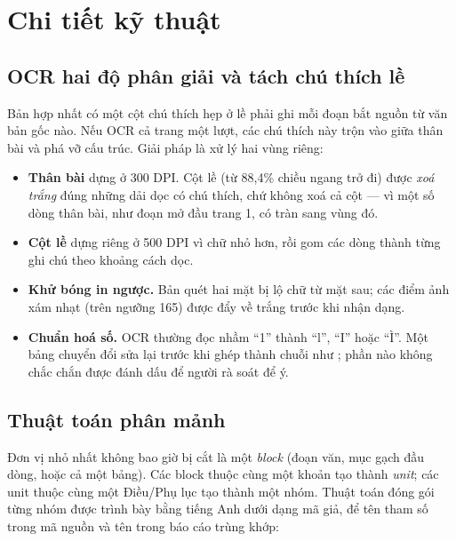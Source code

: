 \section{Chi tiết kỹ thuật}
\label{sec:chitiet}

\subsection{OCR hai độ phân giải và tách chú thích lề}

Bản hợp nhất có một cột chú thích hẹp ở lề phải ghi mỗi đoạn bắt nguồn từ văn bản gốc nào. Nếu
OCR cả trang một lượt, các chú thích này trộn vào giữa thân bài và phá vỡ cấu trúc. Giải pháp
là xử lý hai vùng riêng:

\begin{itemize}
  \item \textbf{Thân bài} dựng ở 300 DPI. Cột lề (từ 88,4\% chiều ngang trở đi) được
  \emph{xoá trắng} đúng những dải dọc có chú thích, chứ không xoá cả cột — vì một số dòng thân
  bài, như đoạn mở đầu trang 1, có tràn sang vùng đó.
  \item \textbf{Cột lề} dựng riêng ở 500 DPI vì chữ nhỏ hơn, rồi gom các dòng thành từng ghi
  chú theo khoảng cách dọc.
  \item \textbf{Khử bóng in ngược.} Bản quét hai mặt bị lộ chữ từ mặt sau; các điểm ảnh xám
  nhạt (trên ngưỡng 165) được đẩy về trắng trước khi nhận dạng.
  \item \textbf{Chuẩn hoá số.} OCR thường đọc nhầm “1” thành “l”, “I” hoặc “Ì”. Một bảng chuyển
  đổi sửa lại trước khi ghép thành chuỗi như ; phần nào không chắc
  chắn được đánh dấu  để người rà soát để ý.
\end{itemize}

\subsection{Thuật toán phân mảnh}
\label{sec:chunk}

Đơn vị nhỏ nhất không bao giờ bị cắt là một \emph{block} (đoạn văn, mục gạch đầu dòng, hoặc cả
một bảng). Các block thuộc cùng một khoản tạo thành \emph{unit}; các unit thuộc cùng một
Điều/Phụ lục tạo thành một nhóm. Thuật toán đóng gói từng nhóm được trình bày bằng tiếng Anh
dưới dạng mã giả, để tên tham số trong mã nguồn và tên trong báo cáo trùng khớp:


